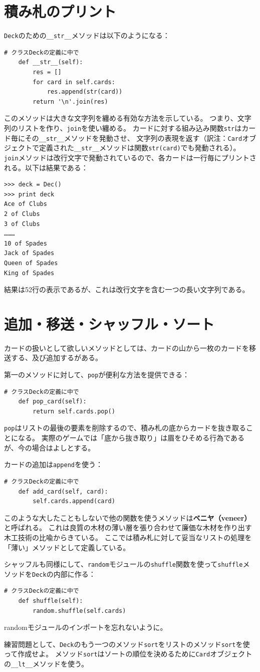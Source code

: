 \documentclass[a4j,12pt,makeidx]{jbook}
\begin{document}
\section{積み札のプリント}
{\tt Deck}のための{\verb"__str__"}メソッドは以下のようになる：
\begin{verbatim}
# クラスDeckの定義に中で
    def __str__(self):
        res = []
        for card in self.cards:
            res.append(str(card))
        return '\n'.join(res)
\end{verbatim}
このメソッドは大きな文字列を纏める有効な方法を示している。
つまり、文字列のリストを作り、{\tt join}を使い纏める。
カードに対する組み込み関数{\tt str}はカード毎にその{\verb"__str__"}メソッドを発動させ、
文字列の表現を返す（訳注：{{\tt Card}オブジェクトで定義された\verb"__str__"}メソッドは関数{\tt str(card)}でも発動される）。
{\tt join}メソッドは改行文字で発動されているので、各カードは一行毎にプリントされる。以下は結果である：
\begin{verbatim}
>>> deck = Dec()
>>> print deck
Ace of Clubs
2 of Clubs
3 of Clubs
………
10 of Spades
Jack of Spades
Queen of Spades
King of Spades
\end{verbatim}
結果は52行の表示であるが、これは改行文字を含む一つの長い文字列である。
%
\section{追加・移送・シャッフル・ソート}
カードの扱いとして欲しいメソッドとしては、カードの山から一枚のカードを移送する、及び追加するがある。\par
第一のメソッドに対して、{\tt pop}が便利な方法を提供できる：
\begin{verbatim}
# クラスDeckの定義に中で
    def pop_card(self):
        return self.cards.pop()
\end{verbatim}       
{\tt pop}はリストの最後の要素を削除するので、積み札の底からカードを抜き取ることになる。
実際のゲームでは「底から抜き取り」は眉をひそめる行為であるが、今の場合はよしとする。\par
カードの追加は{\tt append}を使う：
\begin{verbatim}
# クラスDeckの定義に中で
    def add_card(self, card):
        self.cards.append(card)
\end{verbatim}
このような大したこともしないで他の関数を使うメソッドは{\bf ベニヤ（veneer）}と呼ばれる。
これは良質の木材の薄い層を張り合わせて廉価な木材を作り出す木工技術の比喩からきている。
ここでは積み札に対して妥当なリストの処理を「薄い」メソッドとして定義している。\par
シャッフルも同様にして、{\tt random}モジュールの{\tt shuffle}関数を使って{\tt shuffle}メソッドを{\tt Deck}の内部に作る：
\begin{verbatim}
# クラスDeckの定義に中で
    def shuffle(self):
        random.shuffle(self.cards)
\end{verbatim}
randomモジュールのインポートを忘れないように。\par
練習問題として、{\tt Deck}のもう一つのメソッド{\tt sort}をリストのメソッド{\tt sort}を使って作成せよ。
メソッド{\tt sort}はソートの順位を決めるために{\tt Card}オブジェクトの{\verb"__lt__"}メソッドを使う。
%
\end{document}
